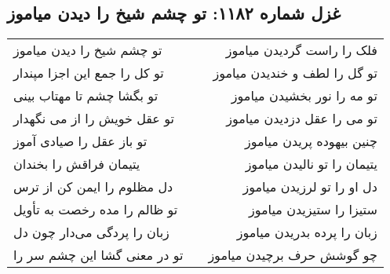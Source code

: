 \begin{center}
\section*{غزل شماره ۱۱۸۲: تو چشم شیخ را دیدن میاموز}
\label{sec:1182}
\begin{longtable}{l p{0.5cm} r}
تو چشم شیخ را دیدن میاموز
&&
فلک را راست گردیدن میاموز
\\
تو کل را جمع این اجزا مپندار
&&
تو گل را لطف و خندیدن میاموز
\\
تو بگشا چشم تا مهتاب بینی
&&
تو مه را نور بخشیدن میاموز
\\
تو عقل خویش را از می نگهدار
&&
تو می را عقل دزدیدن میاموز
\\
تو باز عقل را صیادی آموز
&&
چنین بیهوده پریدن میاموز
\\
یتیمان فراقش را بخندان
&&
یتیمان را تو نالیدن میاموز
\\
دل مظلوم را ایمن کن از ترس
&&
دل او را تو لرزیدن میاموز
\\
تو ظالم را مده رخصت به تأویل
&&
ستیزا را ستیزیدن میاموز
\\
زبان را پردگی می‌دار چون دل
&&
زبان را پرده بدریدن میاموز
\\
تو در معنی گشا این چشم سر را
&&
چو گوشش حرف برچیدن میاموز
\\
\end{longtable}
\end{center}
